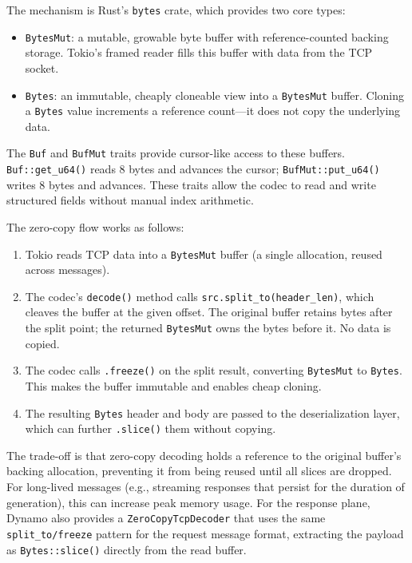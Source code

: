 The mechanism is Rust's \texttt{bytes} crate, which provides two core types:

\begin{itemize}
  \item \texttt{BytesMut}: a mutable, growable byte buffer with reference-counted backing storage. Tokio's framed reader fills this buffer with data from the TCP socket.
  \item \texttt{Bytes}: an immutable, cheaply cloneable view into a \texttt{BytesMut} buffer. Cloning a \texttt{Bytes} value increments a reference count---it does not copy the underlying data.
\end{itemize}

The \texttt{Buf} and \texttt{BufMut} traits provide cursor-like access to these buffers. \texttt{Buf::get\_u64()} reads 8 bytes and advances the cursor; \texttt{BufMut::put\_u64()} writes 8 bytes and advances. These traits allow the codec to read and write structured fields without manual index arithmetic.

The zero-copy flow works as follows:

\begin{enumerate}
  \item Tokio reads TCP data into a \texttt{BytesMut} buffer (a single allocation, reused across messages).
  \item The codec's \texttt{decode()} method calls \texttt{src.split\_to(header\_len)}, which cleaves the buffer at the given offset. The original buffer retains bytes after the split point; the returned \texttt{BytesMut} owns the bytes before it. No data is copied.
  \item The codec calls \texttt{.freeze()} on the split result, converting \texttt{BytesMut} to \texttt{Bytes}. This makes the buffer immutable and enables cheap cloning.
  \item The resulting \texttt{Bytes} header and body are passed to the deserialization layer, which can further \texttt{.slice()} them without copying.
\end{enumerate}

The trade-off is that zero-copy decoding holds a reference to the original buffer's backing allocation, preventing it from being reused until all slices are dropped. For long-lived messages (e.g., streaming responses that persist for the duration of generation), this can increase peak memory usage. For the response plane, Dynamo also provides a \texttt{ZeroCopyTcpDecoder} that uses the same \texttt{split\_to/freeze} pattern for the request message format, extracting the payload as \texttt{Bytes::slice()} directly from the read buffer.

